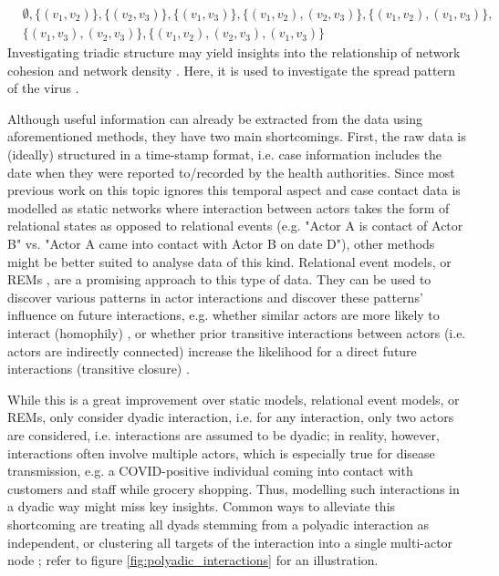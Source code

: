 \documentclass{article}
\begin{document}
\begin{itemize}
		\begin{align*}
			&\emptyset,\{(v_1,v_2)\},\{(v_2,v_3)\},\{(v_1,v_3)\},\{(v_1,v_2),(v_2,v_3)\},\{(v_1,v_2),(v_1,v_3)\},\\ &\{(v_1,v_3),(v_2,v_3)\},\{(v_1,v_2),(v_2,v_3),(v_1,v_3)\}
		\end{align*}
		Investigating triadic structure may yield insights into the relationship of network cohesion and network density \cite{triadic_effects}. Here, it is used to investigate the spread pattern of the virus \cite{shanxi_data}.
	\end{itemize}
	
	\noindent Although useful information can already be extracted from the data using aforementioned methods, they have two main shortcomings. First, the raw data is (ideally) structured in a time-stamp format, i.e. case information includes the date when they were reported to/recorded by the health authorities. Since most previous work on this topic ignores this temporal aspect and case contact data is modelled as static networks where interaction between actors takes the form of relational states as opposed to relational events (e.g. "Actor A is contact of Actor B" vs. "Actor A came into contact with Actor B on date D"), other methods might be better suited to analyse data of this kind. Relational event models, or REMs \cite{perry2013point,butts20084}, are a promising approach to this type of data. They can be used to discover various patterns in actor interactions and discover these patterns' influence on future interactions, e.g. whether similar actors are more likely to interact (homophily) \cite{butts20084,pilny_rem}, or whether prior transitive interactions between actors (i.e. actors are indirectly connected) increase the likelihood for a direct future interactions (transitive closure) \cite{butts20084}.
	
	While this is a great improvement over static models, relational event models, or REMs, only consider dyadic interaction, i.e. for any interaction, only two actors are considered, i.e. interactions are assumed to be dyadic; in reality, however, interactions often involve multiple actors, which is especially true for disease transmission, e.g. a COVID-positive individual coming into contact with customers and staff while grocery shopping. Thus, modelling such interactions in a dyadic way might miss key insights. Common ways to alleviate this shortcoming are treating all dyads stemming from a polyadic interaction as independent, or clustering all targets of the interaction into a single multi-actor node \cite{butts20084,perry2013point}; refer to figure \ref{fig:polyadic_interactions} for an illustration.
	
\end{document}
